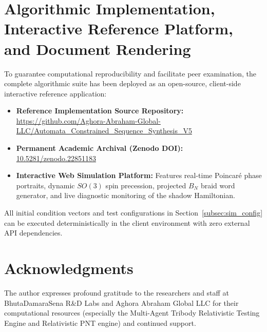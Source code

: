 \documentclass[11pt,a4paper,reqno]{article}
\theoremstyle{plain}
\theoremstyle{definition}
\theoremstyle{remark}
\numberwithin{equation}{section}
\begin{document}
\section{Algorithmic Implementation, Interactive Reference Platform, and Document Rendering}
\label{app:rendering}
To guarantee computational reproducibility and facilitate peer examination, the complete algorithmic suite has been deployed as an open-source, client-side interactive reference application:
\begin{itemize}
    \item \textbf{Reference Implementation Source Repository:} \url{https://github.com/Aghora-Abraham-Global-LLC/Automata_Constrained_Sequence_Synthesis_V5}
    \item \textbf{Permanent Academic Archival (Zenodo DOI):} \href{https://doi.org/10.5281/zenodo.22851183}{10.5281/zenodo.22851183}
    \item \textbf{Interactive Web Simulation Platform:} Features real-time Poincaré phase portraits, dynamic $SO(3)$ spin precession, projected $B_N$ braid word generator, and live diagnostic monitoring of the shadow Hamiltonian.
\end{itemize}
All initial condition vectors and test configurations in Section~\ref{subsec:sim_config} can be executed deterministically in the client environment with zero external API dependencies.

\section*{Acknowledgments}
The author expresses profound gratitude to the researchers and staff at BhutaDamaraSena R\&D Labs and Aghora Abraham Global LLC for their computational resources (especially the Multi-Agent Tribody Relativistic Testing Engine and Relativistic PNT engine) and continued support.
\end{document}
